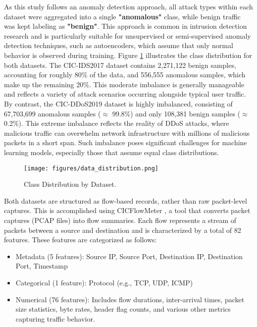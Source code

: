 As this study follows an anomaly detection approach, all attack types within each dataset were aggregated into a single \textbf{"anomalous" } class, while benign traffic was kept labeling as \textbf{"benign"}. This approach is common in intrusion detection research and is particularly suitable for unsupervised or semi-supervised anomaly detection techniques, such as autoencoders, which assume that only normal behavior is observed during training. Figure \ref{fig:data_distribution} illustrates the class distribution for both datasets. The CIC-IDS2017 dataset contains 2,271,122 benign samples, accounting for roughly 80\% of the data, and 556,555 anomalous samples, which make up the remaining 20\%. This moderate imbalance is generally manageable and reflects a variety of attack scenarios occurring alongside typical user traffic. By contrast, the CIC-DDoS2019 dataset is highly imbalanced, consisting of 67,703,699 anomalous samples ($\approx$ 99.8\%) and only 108,381 benign samples ($\approx$ 0.2\%). This extreme imbalance reflects the reality of DDoS attacks, where malicious traffic can overwhelm network infrastructure with millions of malicious packets in a short span. Such imbalance poses significant challenges for machine learning models, especially those that assume equal class distributions.

\begin{figure}[h]
    \centering
    \texttt{[image: figures/data\_distribution.png]}
    \caption{Class Distribution by Dataset.}
    \label{fig:data_distribution}
\end{figure}

Both datasets are structured as flow-based records, rather than raw packet-level captures. This is accomplished using CICFlowMeter \citep{cicflowmeter}, a tool that converts packet captures (PCAP files) into flow summaries. Each flow represents a stream of packets between a source and destination and is characterized by a total of 82 features. These features are categorized as follows:

\begin{itemize}
    \item Metadata (5 features): Source IP, Source Port, Destination IP, Destination Port, Timestamp
    \item Categorical (1 feature): Protocol (e.g., TCP, UDP, ICMP)
    \item Numerical (76 features): Includes flow durations, inter-arrival times, packet size statistics, byte rates, header flag counts, and various other metrics capturing traffic behavior.
\end{itemize}

